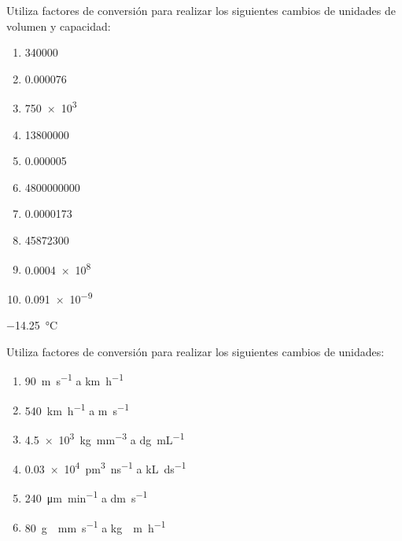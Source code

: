 \begin{exercise}[
    tags    = {unidades, notación científica},
    topics  = {unidades, medida, física, química},
    source  = {MERES},
  ]
  Utiliza factores de conversión para realizar los siguientes cambios de unidades de volumen y capacidad:
  \begin{multicols}{2}
    \begin{enumerate}
      \item \num{340000}
      \item \num{0.000076}
      \item \num{750e3}
      \item \num{13800000}
      \item \num{0.000005}
      \item \num{4800000000}
      \item \num{0.0000173}
      \item \num{45872300}
      \item \num{0.0004e8}
      \item \num{0.091e-9}
    \end{enumerate}
  \end{multicols}
\end{exercise}

\begin{solution}
  \SI{-14,25}{\celsius}
\end{solution}



\begin{exercise}[
    tags    = {unidades, factores de conversión, conversión, 2 unidades},
    topics  = {unidades, medida, física, química},
    source  = {MERES},
  ]
  Utiliza factores de conversión para realizar los siguientes cambios de unidades:
  \begin{multicols}{2}
    \begin{enumerate}
      \item \SI{90}{\m\per\s} a \si{\km\per\hour}
      \item \SI{540}{\km\per\hour} a \si{\m\per\s}
      \item \SI{4.5e3}{\kg\per\cubic\mm} a \si{\deci\g\per\mL}
      \item \SI{0.03e4}{\cubic\pm\per\ns} a \si{\kilo\L\per\deci\s}
      \item \SI{240}{\um\per\minute} a \si{\dm\per\s}
      \item \SI{80}{\g\cdot\mm\per\s} a \si{\kg\cdot\m\per\hour}
    \end{enumerate}
  \end{multicols}
\end{exercise}

